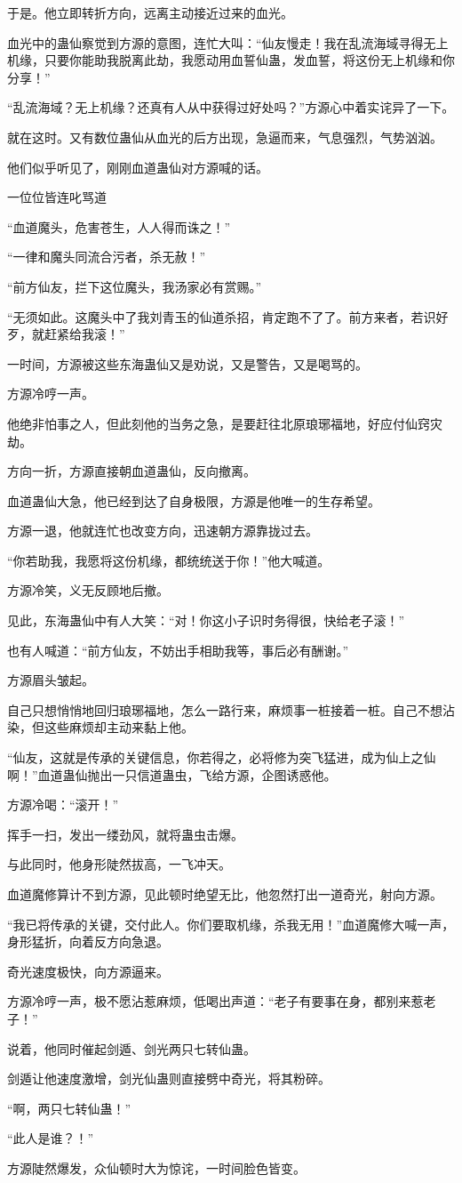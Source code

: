 \begin{this_body}
于是。他立即转折方向，远离主动接近过来的血光。

血光中的蛊仙察觉到方源的意图，连忙大叫：“仙友慢走！我在乱流海域寻得无上机缘，只要你能助我脱离此劫，我愿动用血誓仙蛊，发血誓，将这份无上机缘和你分享！”

“乱流海域？无上机缘？还真有人从中获得过好处吗？”方源心中着实诧异了一下。

就在这时。又有数位蛊仙从血光的后方出现，急逼而来，气息强烈，气势汹汹。

他们似乎听见了，刚刚血道蛊仙对方源喊的话。

一位位皆连叱骂道

“血道魔头，危害苍生，人人得而诛之！”

“一律和魔头同流合污者，杀无赦！”

“前方仙友，拦下这位魔头，我汤家必有赏赐。”

“无须如此。这魔头中了我刘青玉的仙道杀招，肯定跑不了了。前方来者，若识好歹，就赶紧给我滚！”

一时间，方源被这些东海蛊仙又是劝说，又是警告，又是喝骂的。

方源冷哼一声。

他绝非怕事之人，但此刻他的当务之急，是要赶往北原琅琊福地，好应付仙窍灾劫。

方向一折，方源直接朝血道蛊仙，反向撤离。

血道蛊仙大急，他已经到达了自身极限，方源是他唯一的生存希望。

方源一退，他就连忙也改变方向，迅速朝方源靠拢过去。

“你若助我，我愿将这份机缘，都统统送于你！”他大喊道。

方源冷笑，义无反顾地后撤。

见此，东海蛊仙中有人大笑：“对！你这小子识时务得很，快给老子滚！”

也有人喊道：“前方仙友，不妨出手相助我等，事后必有酬谢。”

方源眉头皱起。

自己只想悄悄地回归琅琊福地，怎么一路行来，麻烦事一桩接着一桩。自己不想沾染，但这些麻烦却主动来黏上他。

“仙友，这就是传承的关键信息，你若得之，必将修为突飞猛进，成为仙上之仙啊！”血道蛊仙抛出一只信道蛊虫，飞给方源，企图诱惑他。

方源冷喝：“滚开！”

挥手一扫，发出一缕劲风，就将蛊虫击爆。

与此同时，他身形陡然拔高，一飞冲天。

血道魔修算计不到方源，见此顿时绝望无比，他忽然打出一道奇光，射向方源。

“我已将传承的关键，交付此人。你们要取机缘，杀我无用！”血道魔修大喊一声，身形猛折，向着反方向急退。

奇光速度极快，向方源逼来。

方源冷哼一声，极不愿沾惹麻烦，低喝出声道：“老子有要事在身，都别来惹老子！”

说着，他同时催起剑遁、剑光两只七转仙蛊。

剑遁让他速度激增，剑光仙蛊则直接劈中奇光，将其粉碎。

“啊，两只七转仙蛊！”

“此人是谁？！”

方源陡然爆发，众仙顿时大为惊诧，一时间脸色皆变。

\end{this_body}

